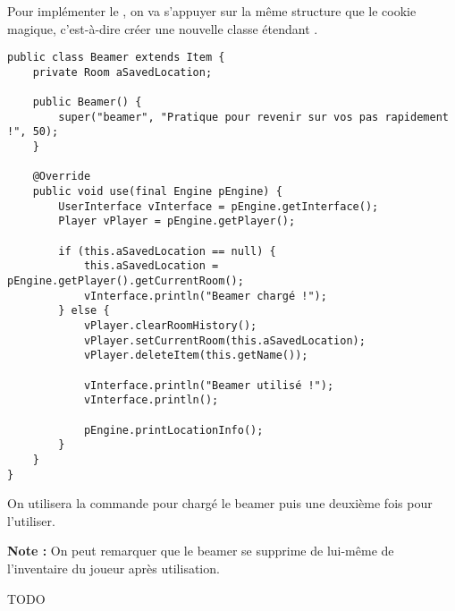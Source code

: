 \begin{exercise}[subtitle=Beamer]

Pour implémenter le , on va s'appuyer sur la même structure que le cookie magique, c'est-à-dire créer une nouvelle classe  étendant . 

\begin{verbatim}
public class Beamer extends Item {
    private Room aSavedLocation;

    public Beamer() {
        super("beamer", "Pratique pour revenir sur vos pas rapidement !", 50);
    }

    @Override
    public void use(final Engine pEngine) {
        UserInterface vInterface = pEngine.getInterface();
        Player vPlayer = pEngine.getPlayer();

        if (this.aSavedLocation == null) {
            this.aSavedLocation = pEngine.getPlayer().getCurrentRoom();
            vInterface.println("Beamer chargé !");
        } else {
            vPlayer.clearRoomHistory();
            vPlayer.setCurrentRoom(this.aSavedLocation);
            vPlayer.deleteItem(this.getName());

            vInterface.println("Beamer utilisé !");
            vInterface.println();

            pEngine.printLocationInfo();
        }
    }
}
\end{verbatim}

On utilisera la commande  pour chargé le beamer puis une deuxième fois  pour l'utiliser.

\textbf{Note :} On peut remarquer que le beamer se supprime de lui-même de l'inventaire du joueur après utilisation.

\end{exercise}

\begin{exercise}[subtitle=locked door]

TODO

\end{exercise}

